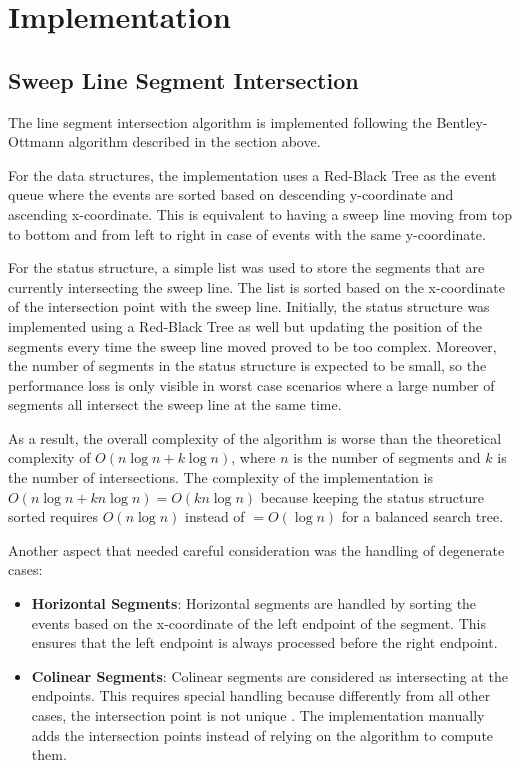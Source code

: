 \section{Implementation}
\subsection{Sweep Line Segment Intersection}
The line segment intersection algorithm is implemented following the Bentley-Ottmann algorithm described in the section above.

For the data structures, the implementation uses a Red-Black Tree as the event queue where the events are sorted based on descending y-coordinate and ascending x-coordinate. This is equivalent to having a sweep line moving from top to bottom and from left to right in case of events with the same y-coordinate.

For the status structure, a simple list was used to store the segments that are currently intersecting the sweep line. The list is sorted based on the x-coordinate of the intersection point with the sweep line. Initially, the status structure was implemented using a Red-Black Tree as well but updating the position of the segments every time the sweep line moved proved to be too complex. Moreover, the number of segments in the status structure is expected to be small, so the performance loss is only visible in worst case scenarios where a large number of segments all intersect the sweep line at the same time.

As a result, the overall complexity of the algorithm is worse than the theoretical complexity of $O(n\log n + k \log n)$, where $n$ is the number of segments and $k$ is the number of intersections. The complexity of the implementation is $O(n\log n + k n\log n) = O(kn\log n)$ because keeping the status structure sorted requires $O(n\log n)$ instead of $=O(\log n)$ for a balanced search tree.

Another aspect that needed careful consideration was the handling of degenerate cases:
\begin{itemize}
    \item \textbf{Horizontal Segments}:  Horizontal segments are handled by sorting the events based on the x-coordinate of the left endpoint of the segment. This ensures that the left endpoint is always processed before the right endpoint.
    \item \textbf{Colinear Segments}: Colinear segments are considered as intersecting at the endpoints. This requires special handling because differently from all other cases, the intersection point is not unique . The implementation manually adds the intersection points instead of relying on the algorithm to compute them.
\end{itemize}


